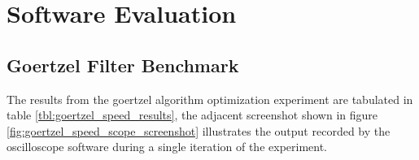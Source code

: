 




\section{Software Evaluation}


\subsection{Goertzel Filter Benchmark}

The results from the goertzel algorithm optimization experiment are tabulated in table \ref{tbl:goertzel_speed_results}, the adjacent screenshot shown in figure \ref{fig:goertzel_speed_scope_screenshot} illustrates the output recorded by the oscilloscope software during a single iteration of the experiment. 

